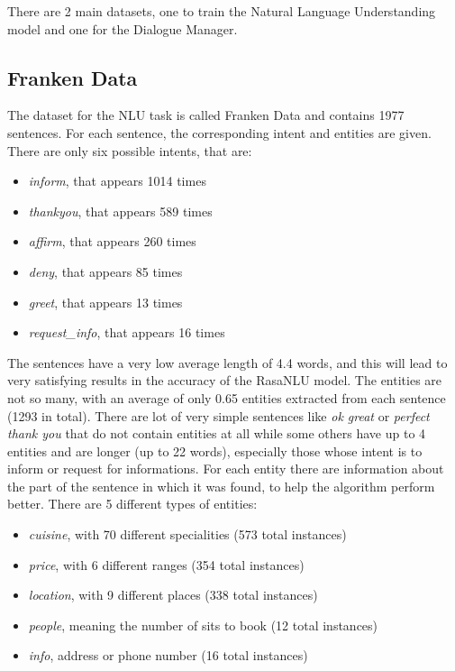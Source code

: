 \documentclass[11pt,a4paper]{article}
\begin{document}
There are 2 main datasets, one to train the Natural Language Understanding model and one for the Dialogue Manager.

\subsection{Franken Data}

The dataset for the NLU task is called Franken Data and contains 1977 sentences. For each sentence, the corresponding intent and entities are given. There are only six possible intents, that are: 

\begin{itemize}
\item \textit{inform}, that appears 1014 times
\item \textit{thankyou}, that appears 589 times
\item \textit{affirm}, that appears 260 times
\item \textit{deny}, that appears 85 times
\item \textit{greet}, that appears 13 times
\item \textit{request\_info}, that appears 16 times
\end{itemize}

The sentences have a very low average length of 4.4 words, and this will lead to very satisfying results in the accuracy of the RasaNLU model.
The entities are not so many, with an average of only 0.65 entities extracted from each sentence (1293 in total). There are lot of very simple sentences like \textit{ok great} or \textit{perfect thank you} that do not contain entities at all while some others have up to 4 entities and are longer (up to 22 words), especially those whose intent is to inform or request for informations. For each entity there are information about the part of the sentence in which it was found, to help the algorithm perform better. There are 5 different types of entities:

\begin{itemize}
\item \textit{cuisine}, with 70 different specialities (573 total instances)
\item \textit{price}, with 6 different ranges (354 total instances)
\item \textit{location}, with 9 different places (338 total instances)
\item \textit{people}, meaning the number of sits to book (12 total instances)
\item \textit{info}, address or phone number (16 total instances)
\end{itemize}
\end{document}
